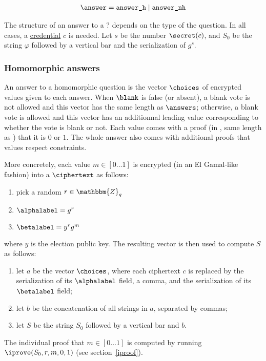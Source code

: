 \documentclass[a4paper]{article}
\newcommand{\Z}{\mathbbm{Z}}
\begin{document}
\begin{gather*}
  \answer=\texttt{answer\_h}\mid\texttt{answer\_nh}
\end{gather*}

The structure of an answer to a \hyperref[elections]{$\question$}
depends on the type of the question. In all cases, a
\hyperref[credentials]{credential} $c$ is needed. Let $s$ be the
number $\secret(c)$, and $S_0$ be the string $\varphi$ followed by a
vertical bar and the serialization of $g^s$.

\subsubsection{Homomorphic answers}

An answer to a homomorphic question is the vector
$\choices$ of encrypted values given to each answer. When $\blank$ is
false (or absent), a blank vote is not allowed and this vector has the
same length as $\answers$; otherwise, a blank vote is allowed and this
vector has an additionnal leading value corresponding to whether the
vote is blank or not.  Each value comes with a proof (in \iproofs,
same length as \choices) that it is $0$ or $1$. The whole answer also
comes with additional proofs that values respect constraints.

More concretely, each value $m\in[0\dots1]$ is encrypted (in an El
Gamal-like fashion) into a $\ciphertext$ as follows:
\begin{enumerate}
\item pick a random $r\in\Z_q$
\item $\alphalabel=g^r$
\item $\betalabel=y^rg^m$
\end{enumerate}
where $y$ is the election public key. The resulting vector is then
used to compute $S$ as follows:
\begin{enumerate}
\item let $a$ be the vector $\choices$, where each ciphertext $c$ is
  replaced by the serialization of its $\alphalabel$ field, a comma,
  and the serialization of its $\betalabel$ field;
\item let $b$ be the concatenation of all strings in $a$, separated
  by commas;
\item let $S$ be the string $S_0$ followed by a vertical bar and $b$.
\end{enumerate}

The individual proof that $m\in[0\dots1]$ is computed by running
$\iprove(S_0,r,m,0,1)$ (see section~\ref{iproof}).
\end{document}
